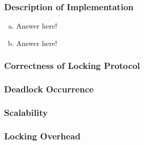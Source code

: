 \documentclass[11pt,a4paper,english]{article}
\begin{document}
\subsubsection{Description of Implementation}
\begin{enumerate}[(a)]
\item{Answer here!}
\item{Answer here!}
\end{enumerate}

\subsubsection{Correctness of Locking Protocol}
\subsubsection{Deadlock Occurrence}
\subsubsection{Scalability}
\subsubsection{Locking Overhead}
\end{document}
